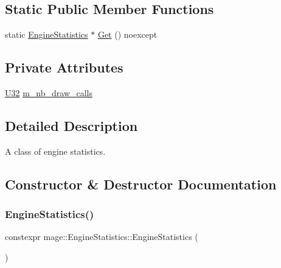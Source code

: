 \subsection*{Static Public Member Functions}
\begin{DoxyCompactItemize}
\item 
static \hyperlink{classmage_1_1_engine_statistics}{Engine\+Statistics} $\ast$ \hyperlink{classmage_1_1_engine_statistics_a7eb0d3a988676f71eea8e9f26ab07f42}{Get} () noexcept
\end{DoxyCompactItemize}
\subsection*{Private Attributes}
\begin{DoxyCompactItemize}
\item 
\hyperlink{namespacemage_a41c104c036fba3756a74e19f793eeaa1}{U32} \hyperlink{classmage_1_1_engine_statistics_a26eeba872cebff2657b8b023751b1894}{m\+\_\+nb\+\_\+draw\+\_\+calls}
\end{DoxyCompactItemize}


\subsection{Detailed Description}
A class of engine statistics. 

\subsection{Constructor \& Destructor Documentation}
\hypertarget{classmage_1_1_engine_statistics_a0f0d19fdbdf37d28feb2885c0cc2b6a0}{}\label{classmage_1_1_engine_statistics_a0f0d19fdbdf37d28feb2885c0cc2b6a0} 
\subsubsection{\texorpdfstring{Engine\+Statistics()}{EngineStatistics()}\hspace{0.1cm}{\footnotesize\ttfamily [1/3]}}
{\footnotesize\ttfamily constexpr mage\+::\+Engine\+Statistics\+::\+Engine\+Statistics (\begin{DoxyParamCaption}{ }\end{DoxyParamCaption})\hspace{0.3cm}{\ttfamily [noexcept]}}

